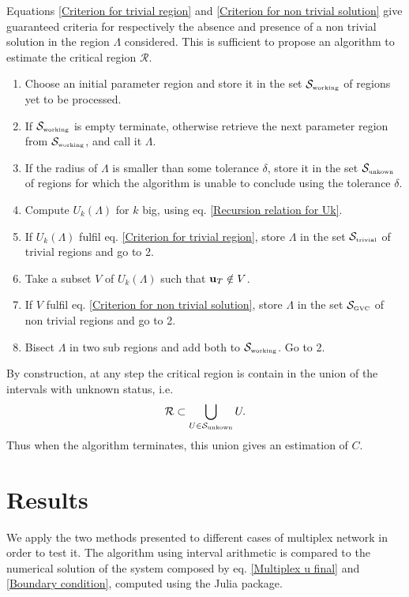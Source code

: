\documentclass[
11pt, %
english, %
singlespacing, %
nolistspacing, %
liststotoc, %
headsepline, %
]{MastersDoctoralThesis} %
\begin{document}
Equations \eqref{Criterion for trivial region} and \eqref{Criterion for non trivial solution} give guaranteed criteria for respectively the absence and presence of a non trivial solution in the region $\Lambda$ considered. This is sufficient to propose an algorithm to estimate the critical region $\mathcal{R}$.

\begin{enumerate}
	\item Choose an initial parameter region and store it in the set $\mathcal{S}_{\text{\tiny working}}$ of regions yet to be processed.
	\item If $\mathcal{S}_{\text{\tiny working}}$ is empty terminate, otherwise retrieve the next parameter region from $\mathcal{S}_{\text{\tiny working}}$, and call it $\Lambda$.
	\item If the radius of $\Lambda$ is smaller than some tolerance $\delta$, store it in the set $\mathcal{S}_{\text{\tiny unkown}}$ of regions for which the algorithm is unable to conclude using the tolerance $\delta$.
	\item Compute $U_k(\Lambda)$ for $k$ big, using eq. \eqref{Recursion relation for Uk}.
	\item If $U_k(\Lambda)$ fulfil eq. \eqref{Criterion for trivial region}, store $\Lambda$ in the set $\mathcal{S}_{\text{\tiny trivial}}$ of trivial regions and go to 2.
	\item Take a subset $V$ of $U_k(\Lambda)$ such that $\boldsymbol{\mathrm{u}}_T \notin V$.
	\item If $V$ fulfil eq. \eqref{Criterion for non trivial solution}, store $\Lambda$ in the set $\mathcal{S}_{\text{\tiny GVC}}$ of non trivial regions and go to 2.
	\item Bisect $\Lambda$ in two sub regions and add both to $\mathcal{S}_{\text{\tiny working}}$. Go to 2.
\end{enumerate}

By construction, at any step the critical region is contain in the union of the intervals with unknown status, i.e.
\begin{align}
	\mathcal{R} \subset \bigcup_{U \in \mathcal{S}_{\text{\tiny unkown}}} U.
\end{align}
Thus when the algorithm terminates, this union gives an estimation of $C$.

\section{Results}

We apply the two methods presented to different cases of multiplex network in order to test it. The algorithm using interval arithmetic is compared to the numerical solution of the system composed by eq. \eqref{Multiplex u final} and \eqref{Boundary condition}, computed using the  Julia package.
\end{document}
